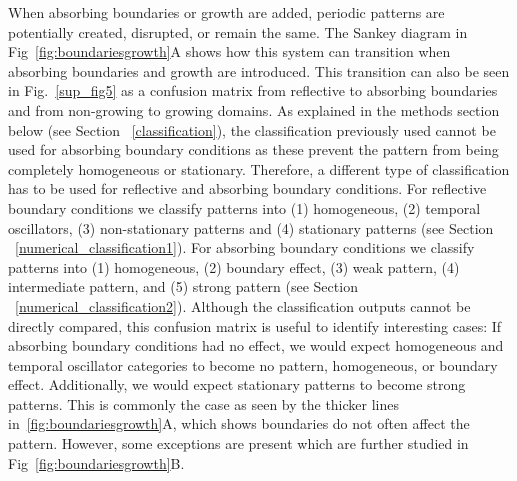When absorbing boundaries or growth are added, periodic patterns are potentially created, disrupted, or remain the same.
The Sankey diagram in Fig~\ref{fig:boundariesgrowth}A shows how this system can transition when absorbing boundaries and growth are introduced.
This transition can also be seen in Fig.~\ref{sup_fig5} as a confusion matrix from reflective to absorbing boundaries and from non-growing to growing domains.
As explained in the methods section below (see Section ~\ref{classification}), the classification previously used cannot be used for absorbing boundary conditions as these prevent the pattern from being completely homogeneous or stationary.  %
Therefore, a different type of classification has to be used for reflective and absorbing boundary conditions.
For reflective boundary conditions we classify patterns into (1) homogeneous, (2) temporal oscillators, (3) non-stationary patterns and (4) stationary patterns (see Section ~\ref{numerical_classification1}). For absorbing boundary conditions we classify patterns into (1) homogeneous, (2) boundary effect, (3) weak pattern, (4) intermediate pattern, and (5) strong pattern (see Section ~\ref{numerical_classification2}).
Although the classification outputs cannot be directly compared, this confusion matrix is useful to identify interesting cases:
If absorbing boundary conditions had no effect, we would expect homogeneous and temporal oscillator categories to become no pattern, homogeneous, or boundary effect.
Additionally, we would expect stationary patterns to become strong patterns.
This is commonly the case as seen by the thicker lines in~\ref{fig:boundariesgrowth}A, which shows boundaries do not often affect the pattern.
However, some exceptions are present which are further studied in Fig~\ref{fig:boundariesgrowth}B.

